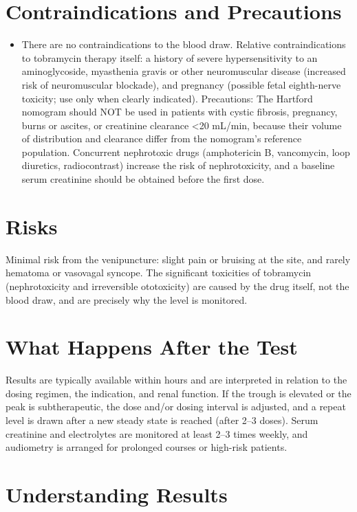\section*{Contraindications and Precautions}
\begin{itemize}
  \item There are no contraindications to the blood draw. Relative contraindications to tobramycin therapy itself: a history of severe hypersensitivity to an aminoglycoside, myasthenia gravis or other neuromuscular disease (increased risk of neuromuscular blockade), and pregnancy (possible fetal eighth-nerve toxicity; use only when clearly indicated). Precautions: The Hartford nomogram should NOT be used in patients with cystic fibrosis, pregnancy, burns or ascites, or creatinine clearance <20 mL/min, because their volume of distribution and clearance differ from the nomogram's reference population. Concurrent nephrotoxic drugs (amphotericin B, vancomycin, loop diuretics, radiocontrast) increase the risk of nephrotoxicity, and a baseline serum creatinine should be obtained before the first dose.
\end{itemize}
\section*{Risks}
Minimal risk from the venipuncture: slight pain or bruising at the site, and rarely hematoma or vasovagal syncope. The significant toxicities of tobramycin (nephrotoxicity and irreversible ototoxicity) are caused by the drug itself, not the blood draw, and are precisely why the level is monitored.

\section*{What Happens After the Test}
Results are typically available within hours and are interpreted in relation to the dosing regimen, the indication, and renal function. If the trough is elevated or the peak is subtherapeutic, the dose and/or dosing interval is adjusted, and a repeat level is drawn after a new steady state is reached (after 2--3 doses). Serum creatinine and electrolytes are monitored at least 2--3 times weekly, and audiometry is arranged for prolonged courses or high-risk patients.

\section*{Understanding Results}

